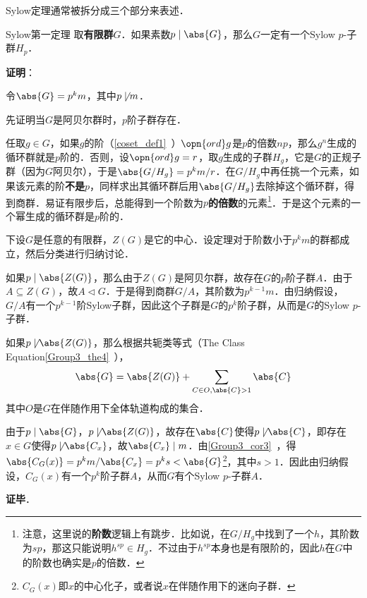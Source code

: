 Sylow定理通常被拆分成三个部分来表述．

\begin{theorem}{Sylow第一定理}
取\textbf{有限群}$G$．如果素数$p\mid\abs{G}$，那么$G$一定有一个Sylow $p$-子群$H_p$．
\end{theorem}

\textbf{证明}：

令$\abs{G}=p^km$，其中$p\not\mid m$．

先证明当$G$是阿贝尔群时，$p$阶子群存在．

任取$g\in G$，如果$g$的阶（\autoref{coset_def1}~）$\opn{ord}g$是$p$的倍数$np$，那么$g^n$生成的循环群就是$p$阶的．否则，设$\opn{ord}g=r$，取$g$生成的子群$H_g$，它是$G$的正规子群（因为$G$阿贝尔），于是$\abs{G/H_g}=p^km/r$．在$G/H_g$中再任挑一个元素，如果该元素的阶\textbf{不是}$p$，同样求出其循环群后用$\abs{G/H_g}$去除掉这个循环群，得到商群．易证有限步后，总能得到一个阶数为$p$\textbf{的倍数}的元素\footnote{注意，这里说的\textbf{阶数}逻辑上有跳步．比如说，在$G/H_g$中找到了一个$h$，其阶数为$sp$，那这只能说明$h^{sp}\in H_g$．不过由于$h^{sp}$本身也是有限阶的，因此$h$在$G$中的阶数也确实是$p$的倍数．}．于是这个元素的一个幂生成的循环群是$p$阶的．

下设$G$是任意的有限群，$Z(G)$是它的中心．设定理对于阶数小于$p^km$的群都成立，然后分类进行归纳讨论．

如果$p\mid \abs{Z(G)}$，那么由于$Z(G)$是阿贝尔群，故存在$G$的$p$阶子群$A$．由于$A\subseteq Z(G)$，故$A\vartriangleleft G$．于是得到商群$G/A$，其阶数为$p^{k-1}m$．由归纳假设，$G/A$有一个$p^{k-1}$阶Sylow子群，因此这个子群是$G$的$p^k$阶子群，从而是$G$的Sylow $p$-子群．

如果$p\not\mid \abs{Z(G)}$，那么根据共轭类等式（The Class Equation\autoref{Group3_the4}~），
\begin{equation}
\abs{G} = \abs{Z(G)} + \sum_{C\in O, \abs{C}>1} \abs{C}
\end{equation}
其中$O$是$G$在伴随作用下全体轨道构成的集合．

由于$p\mid \abs{G}$，$p\not\mid \abs{Z(G)}$，故存在$\abs{C}$使得$p\not\mid \abs{C}$，即存在$x\in G$使得$p\not\mid \abs{C_x}$，故$\abs{C_x}\mid m$．由\autoref{Group3_cor3}~，得$\abs{C_G(x)}=p^km/\abs{C_x}=p^ks<\abs{G}$\footnote{$C_G(x)$即$x$的中心化子，或者说$x$在伴随作用下的迷向子群．}，其中$s>1$．因此由归纳假设，$C_G(x)$有一个$p^k$阶子群$A$，从而$G$有个Sylow $p$-子群$A$．

\textbf{证毕}．





